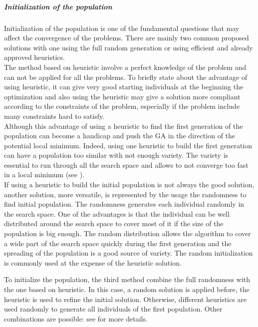 \subparagraph{Initialization of the population}\label{sec:initPOP}
Initialization of the population is one of the fundamental questions that may affect the convergence of the problems. There are mainly two common proposed solutions with one using the full random generation or  using efficient and already approved heuristics.\\
 The method based on heuristic involve a perfect knowledge  of the problem and can not be applied  for all the problems. To briefly state about the advantage of using heuristic, it can give very good starting individuals at the beginning the optimization and also using the heuristic may give a solution more compliant according to the constraints of the problem, especially if the problem include many constraints hard to satisfy. \\
Although this advantage of using a heuristic to find the first generation of the population can become a handicap and push the GA in the direction of the potential local minimum. Indeed, using one heuristic to build the first generation can have a population too similar with not enough variety. The variety is essential to run through all the search space and allows to not converge too fast in a local minimum (see \citep{64*matsui1999}).\\
If using a heuristic to build the initial population is not always the good solution, another solution, more versatile, is represented by the usage the randomness to find initial population. The  randomness generates each individual randomly in the search space. One of the advantages is that the individual can be well distributed around the search space to cover most of it  if the size of the population is big enough. 
The random  distribution allows the algorithm  to cover a wide part of the search space quickly during the first generation and the spreading of the population is a good source of variety.
The random initialization is commonly used at the expense of the heuristic solution.

To initialize the population, the third method combine the full randomness with the one based on heuristic. 
In this case,  a random solution is applied before, the heuristic is used to refine the initial solution. Otherwise, different heuristics are used randomly to generate all individuals of  the first population. Other combinations are possible:  see \cite{113*mais2010} for more details.

